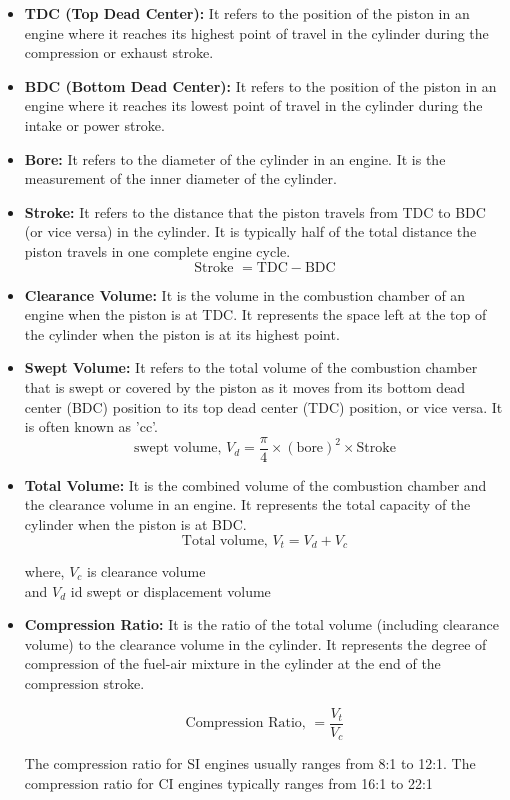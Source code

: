 \documentclass{article}
\begin{document}
\begin{itemize}
	\item \textbf{TDC (Top Dead Center):} It refers to the position of the piston in an engine where it reaches its highest point of travel in the cylinder during the compression or exhaust stroke.

	\item \textbf{BDC (Bottom Dead Center):} It refers to the position of the piston in an engine where it reaches its lowest point of travel in the cylinder during the intake or power stroke.
	
	\item \textbf{Bore:} It refers to the diameter of the cylinder in an engine. It is the measurement of the inner diameter of the cylinder.
	
	\item \textbf{Stroke:} It refers to the distance that the piston travels from TDC to BDC (or vice versa) in the cylinder. It is typically half of the total distance the piston travels in one complete engine cycle.
	\[ \text{Stroke } = \text{TDC} - \text{BDC} \]
	
	
	\item \textbf{Clearance Volume:} It is the volume in the combustion chamber of an engine when the piston is at TDC. It represents the space left at the top of the cylinder when the piston is at its highest point.
	\item \textbf{Swept Volume:} It refers to the total volume of the combustion chamber that is swept or covered by the piston as it moves from its bottom dead center (BDC) position to its top dead center (TDC) position, or vice versa. It is often known as 'cc'.
	\[ \text{swept volume, } V_d = \frac{\pi}{4} \times (\text{bore})^2 \times \text{Stroke} \]

	\item \textbf{Total Volume:} It is the combined volume of the combustion chamber and the clearance volume in an engine. It represents the total capacity of the cylinder when the piston is at BDC. 
		\[ \text{Total volume, } V_t = V_d + V_c \]

		where, $V_c$ is clearance volume \\
		and $V_d$ id swept or displacement volume 

	\item \textbf{Compression Ratio:} It is the ratio of the total volume (including clearance volume) to the clearance volume in the cylinder. It represents the degree of compression of the fuel-air mixture in the cylinder at the end of the compression stroke.
	
	\[ \text{Compression Ratio, } = \frac{V_t}{V_c}\]

	The compression ratio for SI engines usually ranges from 8:1 to 12:1. The compression ratio for CI engines typically ranges from 16:1 to 22:1

\end{itemize}
\end{document}
